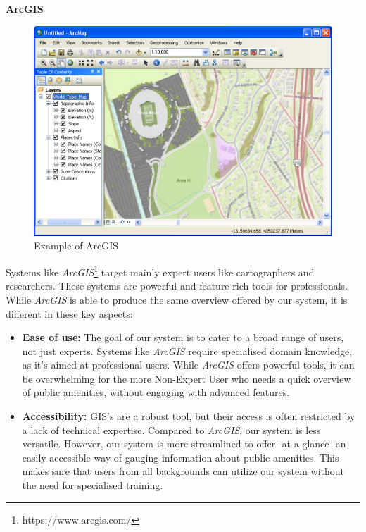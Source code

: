 \newpage{}

\textbf{ArcGIS}

\begin{figure}[htbp]
  \centering{}
  \includegraphics[width=0.85\columnwidth]{images/arcgis.png}
  \caption{Example of ArcGIS}
  \label{fig:arcgis}
\end{figure}

Systems like \textit{ArcGIS}\footnote{https://www.arcgis.com/} target
mainly expert users like cartographers and researchers. These systems are powerful
and feature-rich tools for professionals. While \textit{ArcGIS} is able to produce
the same overview offered by our system, it is different in these key aspects:

\begin{samepage}
\begin{itemize}
    \item{\textbf{Ease of use:} The goal of our system is to cater to a broad
    range of users, not just experts. Systems like \textit{ArcGIS} require
    specialised domain knowledge, as it's aimed at professional users. While
    \textit{ArcGIS} offers powerful tools, it can be overwhelming for the more
    Non-Expert User who needs a quick overview of public amenities, without
    engaging with advanced features.}
  \vspace{1.25mm}

  \item{\textbf{Accessibility:} GIS's are a robust tool, but their access is
  often restricted by a lack of technical expertise. Compared to
  \textit{ArcGIS}, our system is less versatile. However, our system is more
  streamlined to offer- at a glance- an easily accessible way of gauging
  information about public amenities. This makes sure that users from all
  backgrounds can utilize our system without the need for specialised training.}
  \vspace{1.25mm}

\end{itemize}
\end{samepage}


